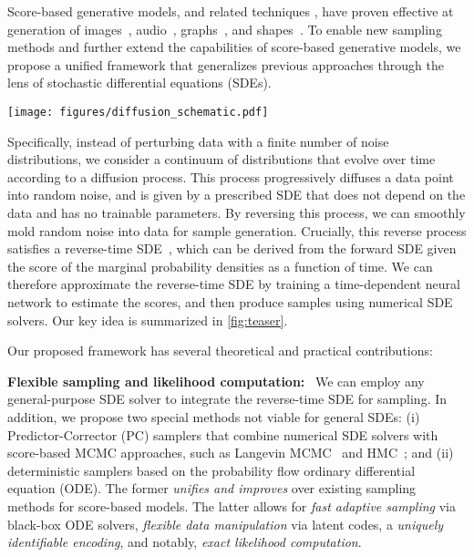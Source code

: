 \documentclass{article} \usepackage{iclr2021_conference,times}
\newcommand{\bfx}{\mathbf{x}}
\begin{document}
Score-based generative models, and related techniques \citep{bordes2017learning,goyal2017variational, du2019implicit}, have proven effective at generation of images~\citep{song2019generative,song2020improved,ho2020denoising}, audio~\citep{chen2020wavegrad,kong2020diffwave}, graphs~\citep{niu20a}, and shapes~\citep{ShapeGF}. To enable new sampling methods and further extend the capabilities of score-based generative models, we propose a unified framework that generalizes previous approaches through the lens of stochastic differential equations (SDEs).



\begin{SCfigure}
    \centering
    \caption{{\bf Solving a reverse-time SDE yields a score-based generative model.} Transforming data to a simple noise distribution can be accomplished with a continuous-time SDE. This SDE can be reversed if we know the score of the distribution at each intermediate time step, $\nabla_\bfx \log p_t(\bfx)$. }
    \texttt{[image: figures/diffusion\_schematic.pdf]}
    \label{fig:teaser}
\end{SCfigure}

Specifically, instead of perturbing data with a finite number of noise distributions, we consider a continuum of distributions that evolve over time according to a diffusion process. This process progressively diffuses a data point into random noise, and is given by a prescribed SDE that does not depend on the data and has no trainable parameters. 
By reversing this process, we can smoothly mold random noise into data for sample generation. Crucially, this reverse process satisfies a reverse-time SDE~\citep{Anderson1982-ny}, which can be derived from the forward SDE given the score of the marginal probability densities as a function of time. We can therefore approximate the reverse-time SDE by training a time-dependent neural network to estimate the scores, and then produce samples using numerical SDE solvers. Our key idea is summarized in \cref{fig:teaser}.

Our proposed framework has several theoretical and practical contributions: 

\textbf{Flexible sampling and likelihood computation:}~ We can employ any general-purpose SDE solver to integrate the reverse-time SDE for sampling. In addition, we propose two special methods not viable for general SDEs: (i) Predictor-Corrector (PC) samplers that combine numerical SDE solvers with score-based MCMC approaches, such as Langevin MCMC~\citep{parisi1981correlation} and HMC~\citep{neal2011mcmc}; and (ii) deterministic samplers based on the probability flow ordinary differential equation (ODE). The former \emph{unifies and improves} over existing sampling methods for score-based models. The latter allows for \emph{fast adaptive sampling} via black-box ODE solvers, \emph{flexible data manipulation} via latent codes, a \emph{uniquely identifiable encoding}, and notably, \emph{exact likelihood computation}.
\end{document}
